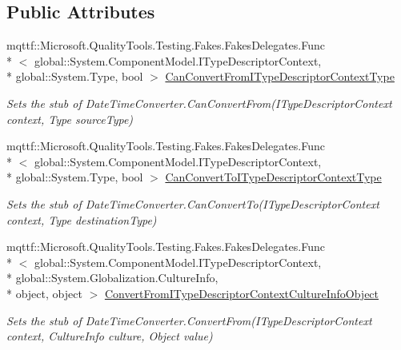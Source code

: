 \subsection*{Public Attributes}
\begin{DoxyCompactItemize}
\item 
mqttf\-::\-Microsoft.\-Quality\-Tools.\-Testing.\-Fakes.\-Fakes\-Delegates.\-Func\\*
$<$ global\-::\-System.\-Component\-Model.\-I\-Type\-Descriptor\-Context, \\*
global\-::\-System.\-Type, bool $>$ \hyperlink{class_system_1_1_component_model_1_1_fakes_1_1_stub_date_time_converter_afdf14de6d92dc3aaf893c8ff63c9aae0}{Can\-Convert\-From\-I\-Type\-Descriptor\-Context\-Type}
\begin{DoxyCompactList}\small\item\em Sets the stub of Date\-Time\-Converter.\-Can\-Convert\-From(\-I\-Type\-Descriptor\-Context context, Type source\-Type)\end{DoxyCompactList}\item 
mqttf\-::\-Microsoft.\-Quality\-Tools.\-Testing.\-Fakes.\-Fakes\-Delegates.\-Func\\*
$<$ global\-::\-System.\-Component\-Model.\-I\-Type\-Descriptor\-Context, \\*
global\-::\-System.\-Type, bool $>$ \hyperlink{class_system_1_1_component_model_1_1_fakes_1_1_stub_date_time_converter_a866fee3fae6f201b3e509e6cd0613c61}{Can\-Convert\-To\-I\-Type\-Descriptor\-Context\-Type}
\begin{DoxyCompactList}\small\item\em Sets the stub of Date\-Time\-Converter.\-Can\-Convert\-To(\-I\-Type\-Descriptor\-Context context, Type destination\-Type)\end{DoxyCompactList}\item 
mqttf\-::\-Microsoft.\-Quality\-Tools.\-Testing.\-Fakes.\-Fakes\-Delegates.\-Func\\*
$<$ global\-::\-System.\-Component\-Model.\-I\-Type\-Descriptor\-Context, \\*
global\-::\-System.\-Globalization.\-Culture\-Info, \\*
object, object $>$ \hyperlink{class_system_1_1_component_model_1_1_fakes_1_1_stub_date_time_converter_a6a5a97d07550983baf6ed98dc1d61ddf}{Convert\-From\-I\-Type\-Descriptor\-Context\-Culture\-Info\-Object}
\begin{DoxyCompactList}\small\item\em Sets the stub of Date\-Time\-Converter.\-Convert\-From(\-I\-Type\-Descriptor\-Context context, Culture\-Info culture, Object value)\end{DoxyCompactList}\item 

\end{DoxyCompactItemize}
